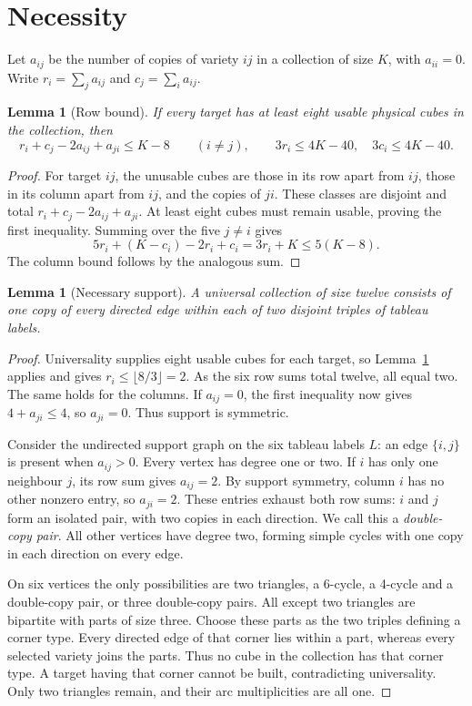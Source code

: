 \documentclass[11pt]{article}
\newtheorem{lemma}[theorem]{Lemma}
\begin{document}
\section{Necessity}
Let $a_{ij}$ be the number of copies of variety $ij$ in a collection of size
$K$, with $a_{ii}=0$. Write $r_i=\sum_j a_{ij}$ and $c_j=\sum_i a_{ij}$.

\begin{lemma}[Row bound]
\label{lem:row-bound}
If every target has at least eight usable physical cubes in the collection,
then
\[
 r_i+c_j-2a_{ij}+a_{ji}\le K-8\qquad(i\ne j),
 \qquad 3r_i\le 4K-40,\quad 3c_i\le4K-40.
\]
\end{lemma}
\begin{proof}
For target $ij$, the unusable cubes are those in its row apart from $ij$,
those in its column apart from $ij$, and the copies of $ji$. These classes
are disjoint and total $r_i+c_j-2a_{ij}+a_{ji}$. At least eight cubes must
remain usable, proving the first inequality. Summing over the five
$j\ne i$ gives
\[
5r_i+(K-c_i)-2r_i+c_i=3r_i+K\le5(K-8).
\]
The column bound follows by the analogous sum.
\end{proof}

\begin{lemma}[Necessary support]
\label{lem:necessary-support}
A universal collection of size twelve consists of one copy of every directed
edge within each of two disjoint triples of tableau labels.
\end{lemma}
\begin{proof}
Universality supplies eight usable cubes for each target, so
Lemma~\ref{lem:row-bound} applies and gives $r_i\le\lfloor8/3\rfloor=2$.
As the six row sums total twelve, all equal two. The same holds for the columns. If $a_{ij}=0$, the
first inequality now gives $4+a_{ji}\le4$, so $a_{ji}=0$. Thus support is
symmetric.

Consider the undirected support graph on the six tableau labels $L$: an
edge $\{i,j\}$ is present when $a_{ij}>0$. Every vertex has degree one
or two. If $i$ has only one neighbour $j$, its row sum gives $a_{ij}=2$.
By support symmetry, column $i$ has no other nonzero entry, so $a_{ji}=2$.
These entries exhaust both row sums: $i$ and $j$ form an isolated pair,
with two copies in each direction. We call this a \emph{double-copy pair}.
All other vertices have degree two, forming simple cycles with one copy
in each direction on every edge.

On six vertices the only possibilities are two triangles, a 6-cycle,
a 4-cycle and a double-copy pair, or three double-copy pairs. All except
two triangles are bipartite with parts of size three. Choose these parts
as the two triples defining a corner type. Every directed edge of that
corner lies within a part, whereas every selected variety joins the parts.
Thus no cube in the collection has that corner type. A target having
that corner cannot be built, contradicting universality. Only two triangles
remain, and their arc multiplicities are all one.
\end{proof}
\end{document}
